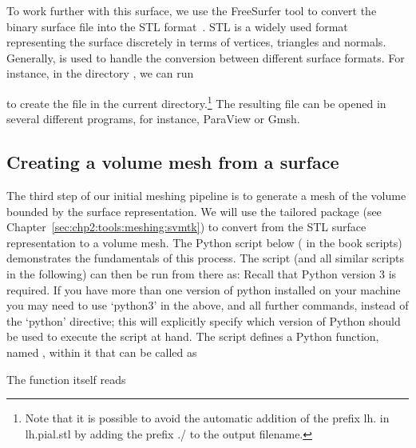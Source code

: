 %
%
To work further with this surface, we use the FreeSurfer tool
 to convert the binary surface file into the STL
format~\cite{roscoe1988stereolithography}. STL is a widely used format
representing the surface discretely in terms of vertices, triangles
and normals. Generally,  is used to handle the
conversion between different surface formats. For instance, in the
directory , we can run


\noindent to create the file  in the current
directory.\footnote{Note that it is possible to avoid the automatic addition of
  the prefix lh. in lh.pial.stl by adding the prefix ./ to the output
  filename.} The resulting file can be opened in several different
programs, for instance, ParaView or Gmsh.

\subsection{Creating a volume mesh from a surface}
\label{subsec:chp3:mesh-creation}

%
%
The third step of our initial meshing pipeline is to generate a mesh
of the volume bounded by the surface representation. We will use the
tailored package \svmtk{} (see
Chapter~\ref{sec:chp2:tools:meshing:svmtk}) to convert from the STL
surface representation to a volume mesh. The Python script below (
 in the book scripts)
demonstrates the fundamentals of this process. The script (and all
similar scripts in the following) can then be run from there as:
Recall that Python version 3 is required. If you have more than one version 
of python installed on your machine you may need to use `python3' in the 
above, and all further commands, instead of the `python' directive; this will 
explicitly specify which version of Python should be used to execute the 
script at hand. %
%
The script  defines a Python function, 
named , within it that can be called as

\noindent The function itself reads

